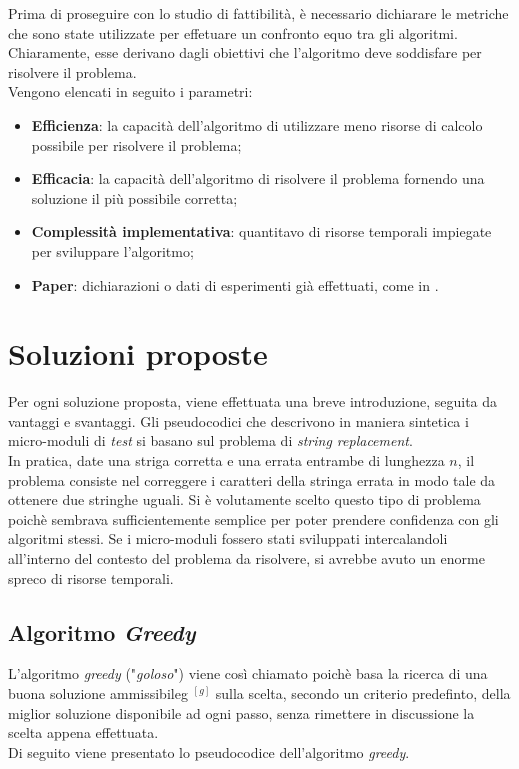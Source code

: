 \noindent Prima di proseguire con lo studio di fattibilità, è necessario dichiarare le metriche che sono state
utilizzate per effetuare un confronto equo tra gli algoritmi. Chiaramente, esse derivano dagli obiettivi che
l'algoritmo deve soddisfare per risolvere il problema.\\
Vengono elencati in seguito i parametri:
\begin{itemize}
    \item \textbf{Efficienza}: la capacità dell'algoritmo di utilizzare meno risorse di calcolo possibile per risolvere il problema;
    \item \textbf{Efficacia}: la capacità dell'algoritmo di risolvere il problema fornendo una soluzione il più possibile corretta;
    \item \textbf{Complessità implementativa}: quantitavo di risorse temporali impiegate per sviluppare l'algoritmo;
    \item \textbf{Paper}: dichiarazioni o dati di esperimenti già effettuati, come in \cite{site:paper-chen} \cite{site:paper-roli} \cite{site:paper-carlos}.
\end{itemize}


\section{Soluzioni proposte}
\noindent Per ogni soluzione proposta, viene effettuata una breve introduzione, seguita da vantaggi e svantaggi.
Gli pseudocodici che descrivono in maniera sintetica i micro-moduli di \textit{test} si basano sul problema di \textit{string replacement}.\\
In pratica, date una striga corretta e una errata entrambe di lunghezza $n$, il problema consiste nel correggere i caratteri della stringa errata
in modo tale da ottenere due stringhe uguali.
Si è volutamente scelto questo tipo di problema poichè sembrava sufficientemente semplice per poter prendere confidenza con gli algoritmi stessi.
Se i micro-moduli fossero stati sviluppati intercalandoli all'interno del contesto del problema da risolvere, si avrebbe avuto un
enorme spreco di risorse temporali.

\subsection{Algoritmo \textit{Greedy}}
\noindent L'algoritmo \textit{greedy} ("\textit{goloso}") \cite{Cormen:algoritmi} viene così chiamato poichè basa la ricerca di una buona
soluzione \gls{ammissibileg} $^{[g]}$ sulla scelta, secondo un criterio predefinto, della miglior soluzione disponibile ad ogni passo, senza
rimettere in discussione la scelta appena effettuata.\\
Di seguito viene presentato lo pseudocodice dell'algoritmo \textit{greedy}.

